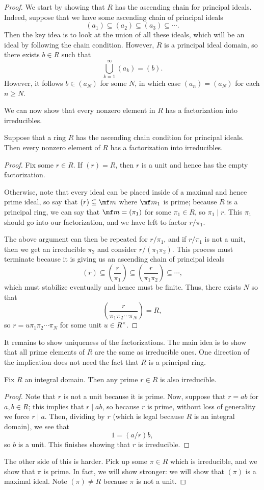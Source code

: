 \begin{proof}
	We start by showing that $R$ has the ascending chain for principal ideals. Indeed, suppose that we have some ascending chain of principal ideals
	\[(a_1)\subseteq (a_2)\subseteq(a_3)\subseteq\cdots.\]
	Then the key idea is to look at the union of all these ideals, which will be an ideal by following the chain condition. However, $R$ is a principal ideal domain, so there exists $b\in R$ such that
	\[\bigcup_{k=1}^\infty(a_k)=(b).\]
	However, it follows $b\in(a_N)$ for some $N$, in which case $(a_n)=(a_N)$ for each $n\ge N$.

	We can now show that every nonzero element in $R$ has a factorization into irreducibles.
	\begin{lemma}
		Suppose that a ring $R$ has the ascending chain condition for principal ideals. Then every nonzero element of $R$ has a factorization into irreducibles.
	\end{lemma}
	\begin{proof}
		Fix some $r\in R$. If $(r)=R$, then $r$ is a unit and hence has the empty factorization.
	
		Otherwise, note that every ideal can be placed inside of a maximal and hence prime ideal, so say that $(r)\subseteq\mf m$ where $\mf m_1$ is prime; because $R$ is a principal ring, we can say that $\mf m=(\pi_1)$ for some $\pi_1\in R$, so $\pi_1\mid r$. This $\pi_1$ should go into our factorization, and we have left to factor $r/\pi_1$.

		The above argument can then be repeated for $r/\pi_1$, and if $r/\pi_1$ is not a unit, then we get an irreducible $\pi_2$ and consider $r/(\pi_1\pi_2)$. This process must terminate because it is giving us an ascending chain of principal ideals
		\[(r)\subseteq\left(\frac r{\pi_1}\right)\subseteq\left(\frac r{\pi_1\pi_2}\right)\subseteq\cdots,\]
		which must stabilize eventually and hence must be finite. Thus, there exists $N$ so that
		\[\left(\frac r{\pi_1\pi_2\cdots\pi_N}\right)=R,\]
		so $r=u\pi_1\pi_2\cdots\pi_N$ for some unit $u\in R^\times$.
	\end{proof}
	It remains to show uniqueness of the factorizations. The main idea is to show that all prime elements of $R$ are the same as irreducible ones. One direction of the implication does not need the fact that $R$ is a principal ring.
	\begin{lemma}
		Fix $R$ an integral domain. Then any prime $r\in R$ is also irreducible.
	\end{lemma}
	\begin{proof}
		Note that $r$ is not a unit because it is prime. Now, suppose that $r=ab$ for $a,b\in R$; this implies that $r\mid ab$, so because $r$ is prime, without loss of generality we force $r\mid a$. Then, dividing by $r$ (which is legal because $R$ is an integral domain), we see that
		\[1=(a/r)b,\]
		so $b$ is a unit. This finishes showing that $r$ is irreducible.
	\end{proof}
	The other side of this is harder. Pick up some $\pi\in R$ which is irreducible, and we show that $\pi$ is prime. In fact, we will show stronger: we will show that $(\pi)$ is a maximal ideal. Note $(\pi)\ne R$ because $\pi$ is not a unit.
	

\end{proof}
